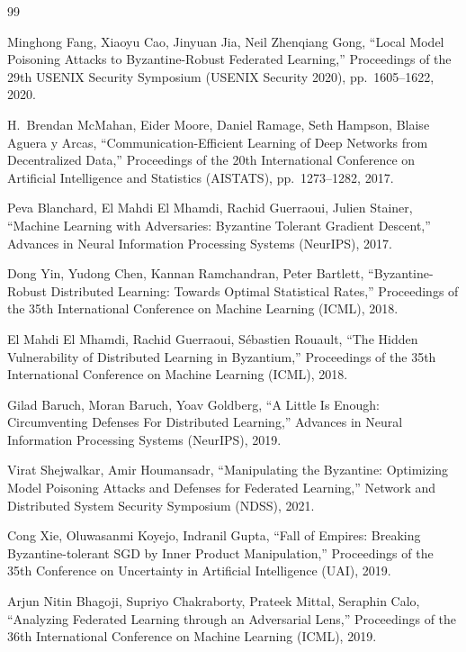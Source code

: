 \documentclass[a4j, dvipdfmx]{jsarticle}  %
\begin{document}
\begin{thebibliography}{99}

Minghong Fang, Xiaoyu Cao, Jinyuan Jia, Neil Zhenqiang Gong,
``Local Model Poisoning Attacks to Byzantine-Robust Federated Learning,''
Proceedings of the 29th USENIX Security Symposium (USENIX Security 2020),
pp.~1605--1622, 2020.

H.~Brendan McMahan, Eider Moore, Daniel Ramage, Seth Hampson, Blaise Aguera y Arcas,
``Communication-Efficient Learning of Deep Networks from Decentralized Data,''
Proceedings of the 20th International Conference on Artificial Intelligence and Statistics (AISTATS),
pp.~1273--1282, 2017.

Peva Blanchard, El Mahdi El Mhamdi, Rachid Guerraoui, Julien Stainer,
``Machine Learning with Adversaries: Byzantine Tolerant Gradient Descent,''
Advances in Neural Information Processing Systems (NeurIPS), 2017.

Dong Yin, Yudong Chen, Kannan Ramchandran, Peter Bartlett,
``Byzantine-Robust Distributed Learning: Towards Optimal Statistical Rates,''
Proceedings of the 35th International Conference on Machine Learning (ICML), 2018.

El Mahdi El Mhamdi, Rachid Guerraoui, S\'ebastien Rouault,
``The Hidden Vulnerability of Distributed Learning in Byzantium,''
Proceedings of the 35th International Conference on Machine Learning (ICML), 2018.

Gilad Baruch, Moran Baruch, Yoav Goldberg,
``A Little Is Enough: Circumventing Defenses For Distributed Learning,''
Advances in Neural Information Processing Systems (NeurIPS), 2019.

Virat Shejwalkar, Amir Houmansadr,
``Manipulating the Byzantine: Optimizing Model Poisoning Attacks and Defenses for Federated Learning,''
Network and Distributed System Security Symposium (NDSS), 2021.

Cong Xie, Oluwasanmi Koyejo, Indranil Gupta,
``Fall of Empires: Breaking Byzantine-tolerant SGD by Inner Product Manipulation,''
Proceedings of the 35th Conference on Uncertainty in Artificial Intelligence (UAI), 2019.

Arjun Nitin Bhagoji, Supriyo Chakraborty, Prateek Mittal, Seraphin Calo,
``Analyzing Federated Learning through an Adversarial Lens,''
Proceedings of the 36th International Conference on Machine Learning (ICML), 2019.


\end{thebibliography}
\end{document}
